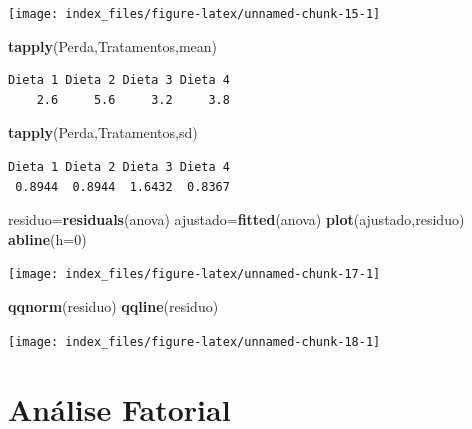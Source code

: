 \documentclass[12pt,brazil,oneside]{book}
\newenvironment{Shaded}{\begin{snugshade}}{\end{snugshade}}
\newcommand{\DataTypeTok}[1]{\textcolor[rgb]{0.13,0.29,0.53}{#1}}
\newcommand{\DecValTok}[1]{\textcolor[rgb]{0.00,0.00,0.81}{#1}}
\newcommand{\KeywordTok}[1]{\textcolor[rgb]{0.13,0.29,0.53}{\textbf{#1}}}
\newcommand{\NormalTok}[1]{#1}
\begin{document}
\begin{center}\texttt{[image: index\_files/figure-latex/unnamed-chunk-15-1]} \end{center}

\begin{Shaded}
\begin{Highlighting}[]
\KeywordTok{tapply}\NormalTok{(Perda,Tratamentos,mean)}
\end{Highlighting}
\end{Shaded}

\begin{verbatim}
Dieta 1 Dieta 2 Dieta 3 Dieta 4 
    2.6     5.6     3.2     3.8 
\end{verbatim}

\begin{Shaded}
\begin{Highlighting}[]
\KeywordTok{tapply}\NormalTok{(Perda,Tratamentos,sd)}
\end{Highlighting}
\end{Shaded}

\begin{verbatim}
Dieta 1 Dieta 2 Dieta 3 Dieta 4 
 0.8944  0.8944  1.6432  0.8367 
\end{verbatim}

\begin{Shaded}
\begin{Highlighting}[]
\NormalTok{residuo=}\KeywordTok{residuals}\NormalTok{(anova)}
\NormalTok{ajustado=}\KeywordTok{fitted}\NormalTok{(anova)}
\KeywordTok{plot}\NormalTok{(ajustado,residuo)}
\KeywordTok{abline}\NormalTok{(}\DataTypeTok{h=}\DecValTok{0}\NormalTok{)}
\end{Highlighting}
\end{Shaded}

\begin{center}\texttt{[image: index\_files/figure-latex/unnamed-chunk-17-1]} \end{center}

\begin{Shaded}
\begin{Highlighting}[]
\KeywordTok{qqnorm}\NormalTok{(residuo)}
\KeywordTok{qqline}\NormalTok{(residuo)}
\end{Highlighting}
\end{Shaded}

\begin{center}\texttt{[image: index\_files/figure-latex/unnamed-chunk-18-1]} \end{center}

\hypertarget{analise-fatorial}{%
\chapter{Análise Fatorial}\label{analise-fatorial}}
\end{document}
